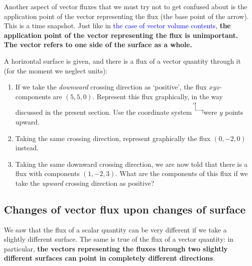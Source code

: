 \documentclass[a4paper,12pt,%
onecolumn,oneside,titlepage,%
british%
]{memoir}
\renewcommand*{\|}[1][]{\nonscript\:#1\vert\nonscript\:\mathopen{}}
\newcommand*{\sect}{\S}%
\renewcommand*{\autoref}[2]{\sidepar{\vspace{-1ex}\footnotesize{\color{blue}\faIcon{%
reply%
}\enspace\sect\,\ref{#1} page\,\pageref{#1}}}\textcolor{blue}{#2}}
\begin{document}
\medskip

Another aspect of vector fluxes that we must try not to get confused about is the application point of the vector representing the flux (the base point of the arrow). This is a time snapshot. Just like in \autoref{item:applicationpoint}{the case of vector volume contents}, \textbf{the application point of the vector representing the flux is unimportant. The vector refers to one side of the surface as a whole.}

\medskip

\begin{exercise}
  A horizontal surface is given, and there is a flux of a vector quantity through it (for the moment we neglect units):
  \begin{enumerate}[label=\arabic*.]
  \item If we take the \emph{downward} crossing direction as \enquote*{positive}, the flux $xyz$-components are $(5,5,0)$. Represent this flux graphically, in the way discussed in the present section. Use the coordinate system\enspace\includegraphics[align=c,height=2em]{images/coords_xy.pdf}\enspace were $y$ points upward.
  \item Taking the same crossing direction, represent graphically the flux $(0,-2,0)$ instead.
  \item Taking the same downward crossing direction, we are now told that there is a flux with components $(1,-2,3)$. What are the components of this flux if we take the \emph{upward} crossing direction as positive?
  \end{enumerate}
\end{exercise}


\medskip

\subsection{Changes of vector flux upon changes of surface}
\label{sec:surface_change_scalar}

We saw that the flux of a scalar quantity can be very different if we take a slightly different surface. The same is true of the flux of a vector quantity: in particular, \textbf{the vectors representing the fluxes through two slightly different surfaces can point in completely different directions}.
\end{document}
